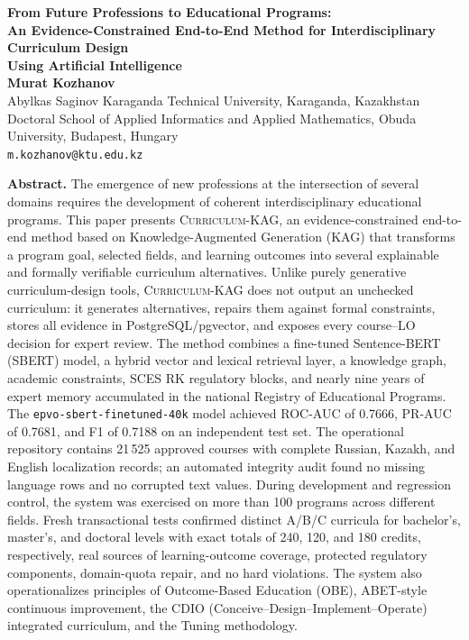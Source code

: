\documentclass[twoside,11pt]{article}
\newcommand{\systemname}{\textsc{Curriculum-KAG}}
\newcommand{\epvomodel}{\texttt{epvo-sbert-\allowbreak finetuned-40k}}
\begin{document}
\begin{center}
{\Large\bfseries From Future Professions to Educational Programs:\\[2pt]
An Evidence-Constrained End-to-End Method for Interdisciplinary Curriculum Design\\
Using Artificial Intelligence}\\[8pt]
{\large\bf Murat Kozhanov}\\[3pt]
Abylkas Saginov Karaganda Technical University, Karaganda, Kazakhstan\\
Doctoral School of Applied Informatics and Applied Mathematics, Obuda University, Budapest, Hungary\\
\texttt{m.kozhanov@ktu.edu.kz}\\[8pt]
\end{center}

\noindent\textbf{Abstract.}
The emergence of new professions at the intersection of several domains requires the development of coherent interdisciplinary educational programs. This paper presents \systemname{}, an evidence-constrained end-to-end method based on Knowledge-Augmented Generation (KAG) that transforms a program goal, selected fields, and learning outcomes into several explainable and formally verifiable curriculum alternatives. Unlike purely generative curriculum-design tools, \systemname{} does not output an unchecked curriculum: it generates alternatives, repairs them against formal constraints, stores all evidence in PostgreSQL/pgvector, and exposes every course--LO decision for expert review. The method combines a fine-tuned Sentence-BERT (SBERT) model, a hybrid vector and lexical retrieval layer, a knowledge graph, academic constraints, SCES RK regulatory blocks, and nearly nine years of expert memory accumulated in the national Registry of Educational Programs. The \epvomodel{} model achieved ROC-AUC of 0.7666, PR-AUC of 0.7681, and F1 of 0.7188 on an independent test set. The operational repository contains 21\,525 approved courses with complete Russian, Kazakh, and English localization records; an automated integrity audit found no missing language rows and no corrupted text values. During development and regression control, the system was exercised on more than 100 programs across different fields. Fresh transactional tests confirmed distinct A/B/C curricula for bachelor's, master's, and doctoral levels with exact totals of 240, 120, and 180 credits, respectively, real sources of learning-outcome coverage, protected regulatory components, domain-quota repair, and no hard violations. The system also operationalizes principles of Outcome-Based Education (OBE), ABET-style continuous improvement, the CDIO (Conceive--Design--Implement--Operate) integrated curriculum, and the Tuning methodology.
\end{document}
